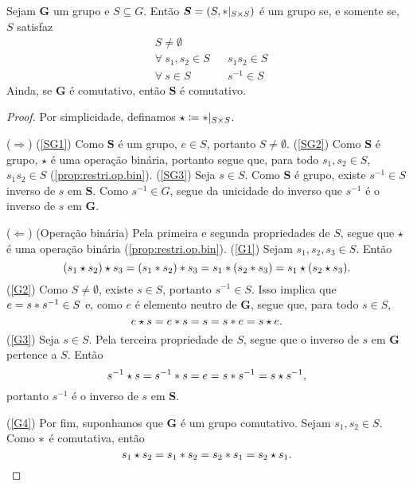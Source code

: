 \begin{prop}
\label{alge:prop.subgru}
Sejam $\bm G$ um grupo e $S \subseteq G$. Então $\bm S=(S,\ast|_{S \times S})$ é um grupo se, e somente se, $S$ satisfaz
	\begin{align*}
	\tag{Não-vacuidade} & S \neq \emptyset && \label{SG1}\\
	\tag{Fechamento da multiplicação} & \forall\ s_1,s_2 \in S  && s_1s_2 \in S \label{SG2}\\
	\tag{Fechamento da inversão} &\forall\ s \in S && s^{-1} \in S \label{SG3}
	\end{align*}
\noindent
Ainda, se $\bm G$ é comutativo, então $\bm S$ é comutativo.
\end{prop}
\begin{proof}
Por simplicidade, definamos $\star \coloneqq \opb|_{S \times S}$.

($\Rightarrow$) (\ref{SG1}) Como $\bm S$ é um grupo, $e \in S$, portanto $S \neq \emptyset$.
(\ref{SG2}) Como $\bm S$ é grupo, $\star$ é uma operação binária, portanto segue que, para todo $s_1,s_2 \in S$, $s_1s_2 \in S$ (\ref{prop:restri.op.bin}).
(\ref{SG3}) Seja $s \in S$. Como $\bm S$ é grupo, existe $s^{-1} \in S$ inverso de $s$ em $\bm S$. Como $s^ {-1} \in G$, segue da unicidade do inverso que $s^{-1}$ é o inverso de $s$ em $\bm G$.

($\Leftarrow$)
(Operação binária) Pela primeira e segunda propriedades de $S$, segue que $\star$ é uma operação binária (\ref{prop:restri.op.bin}).
(\ref{G1}) Sejam $s_1,s_2,s_3 \in S$. Então
	\begin{equation*}
	(s_1 \star s_2) \star s_3 = (s_1 \ast s_2) \ast s_3 = s_1 \ast (s_2 \ast s_3) = s_1 \star (s_2 \star s_3).
	\end{equation*}
(\ref{G2}) Como $S \neq \emptyset$, existe $s \in S$, portanto $s^{-1} \in S$. Isso implica que $e=s \ast s^{-1} \in S$ e, como $e$ é elemento neutro de $\bm G$, segue que, para todo $s \in S$,
	\begin{equation*}
	e \star s = e \ast s = s = s \ast e = s \star e.
	\end{equation*}
(\ref{G3}) Seja $s \in S$. Pela terceira propriedade de $S$, segue que o inverso de $s$ em $\bm G$ pertence a $S$. Então
	\begin{equation*}
	s^ {-1} \star s = s^{-1} \ast s = e = s \ast s^{-1} = s \star s^{-1},
	\end{equation*}
portanto $s^{-1}$ é o inverso de $s$ em $\bm S$.

(\ref{G4}) Por fim, suponhamos que $\bm G$ é um grupo comutativo. Sejam $s_1,s_2 \in S$. Como $\ast$ é comutativa, então
	\begin{equation*}
	s_1 \star s_2 = s_1 \ast s_2 = s_2 \ast s_1 = s_2 \star s_1.
	\end{equation*}
\end{proof}

